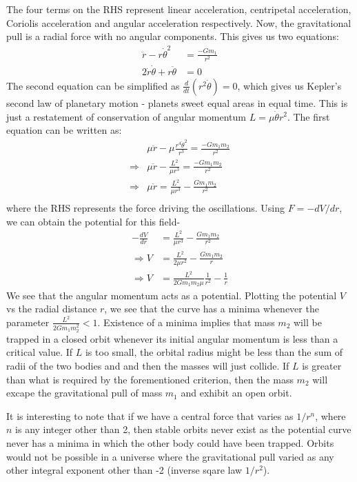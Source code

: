 \documentclass[11pt,a4paper]{article}
\newcommand{\1}{\vect{1}}
\newcommand{\dd}[2]{\frac{d #1}{d #2}}
\begin{document}
The four terms on the RHS represent linear acceleration, centripetal acceleration, Coriolis acceleration and angular acceleration respectively. Now, the gravitational pull is a radial force with no angular components. This gives us two equations:
\begin{align*}
\ddot{r} - r \dot{\theta}^2 &= \frac{-G m_1}{r^2}\\
2\dot r \dot{\theta} + r \ddot{\theta} &= 0
\end{align*}
The second equation can be simplified as $\frac{d}{dt}(r^2\dot{\theta}) = 0$, which gives us Kepler's second law of planetary motion - planets sweet equal areas in equal time. This is just a restatement of conservation of angular momentum $L = \mu \dot{\theta} r^2$. The first equation can be written as:
\begin{align*}
& \mu\ddot{r} - \mu \frac{r^4 \dot{\theta}^2}{r^3} = \frac{-G m_1 m_2}{r^2}\\
\Rightarrow & \mu \ddot{r} - \frac{L^2}{\mu r^3} = \frac{-G m_1 m_2}{r^2}\\
\Rightarrow & \mu\ddot{r} = \frac{L^2}{\mu r^3} - \frac{G m_1 m_2}{r^2}\\
\end{align*}
where the RHS represents the force driving the oscillations. Using $F = -dV/dr$, we can obtain the potential for this field-
\begin{align*}
-\dd{V}{r} &= \frac{L^2}{\mu r^3} - \frac{G m_1 m_2}{r^2}\\
\Rightarrow V &= \frac{L^2}{2\mu r^2} - \frac{G m_1 m_2}{r} \tag{Effective Potential} \\
\Rightarrow V &= \frac{L^2}{2 G m_1 m_2 \mu}\frac{1}{r^2} - \frac{1}{r} 
\end{align*}
We see that the angular momentum acts as a potential. Plotting the potential $V$ vs the radial distance $r$, we see that the curve has a minima whenever the parameter $\frac{L^2}{2 G m_1 m_2^2} < 1$. Existence of a minima implies that mass $m_2$ will be trapped in a closed orbit whenever its initial angular momentum is less than a critical value. If $L$ is too small, the orbital radius might be less than the sum of radii of the two bodies and and then the masses will just collide.
If $L$ is greater than what is required by the forementioned criterion, then the mass $m_2$ will excape the gravitational pull of mass $m_1$ and exhibit an open orbit.

It is interesting to note that if we have a central force that varies as $1/r^n$, where $n$ is any integer other than 2, then stable orbits never exist as the potential curve never has a minima in which the other body could have been trapped. Orbits would not be possible in a universe where the gravitational pull varied as any other integral exponent other than -2 (inverse sqare law $1/r^2$).
\end{document}
